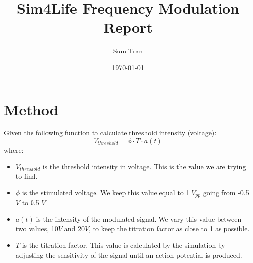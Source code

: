 \documentclass[letterpaper,12pt]{article}
\title{Sim4Life Frequency Modulation Report}
\author{Sam Tran}
\date{\today}
\begin{document}
\maketitle
\section*{Method}

\noindent Given the following function to calculate threshold intensity (voltage):
\begin{equation}
    V_{threshold} = \phi \cdot T \cdot a(t)
\end{equation}
where:
\begin{itemize}
    \item $V_{threshold}$ is the threshold intensity in voltage. This is the value we are trying to find.
    \item $\phi$ is the stimulated voltage. We keep this value equal to 1 $V_{pp}$ going from -0.5 $V$ to 0.5 $V$
    \item $a(t)$ is the intensity of the modulated signal. We vary this value between two values, 10$V$ and 20$V$, to keep the titration factor as close to 1 as possible. 
    \item $T$  is the titration factor. This value is calculated by the simulation by adjusting the sensitivity of the signal until an action potential is produced.
\end{itemize}
\end{document}
